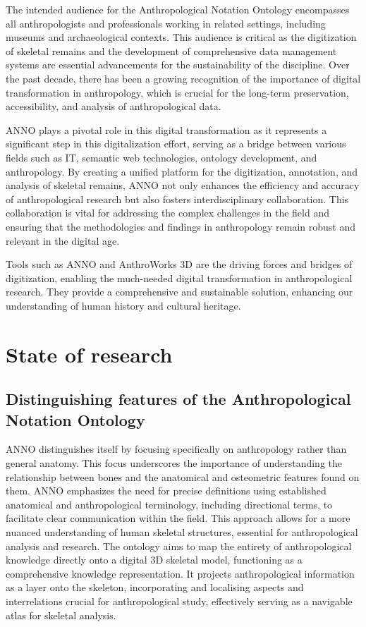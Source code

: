 \documentclass[sw]{iosart2x}
\begin{document}
The intended audience for the Anthropological Notation Ontology encompasses all anthropologists and professionals working in related settings, including museums and archaeological contexts.
This audience is critical as the digitization of skeletal remains and the development of comprehensive data management systems are essential advancements for the sustainability of the discipline.
Over the past decade, there has been a growing recognition of the importance of digital transformation in anthropology, which is crucial for the long-term preservation, accessibility, and analysis of anthropological data.

ANNO plays a pivotal role in this digital transformation as it represents a significant step in this digitalization effort, serving as a bridge between various fields such as IT, semantic web technologies, ontology development, and anthropology.
By creating a unified platform for the digitization, annotation, and analysis of skeletal remains, ANNO not only enhances the efficiency and accuracy of anthropological research but also fosters interdisciplinary collaboration.
This collaboration is vital for addressing the complex challenges in the field and ensuring that the methodologies and findings in anthropology remain robust and relevant in the digital age.

Tools such as ANNO and AnthroWorks 3D are the driving forces and bridges of digitization, enabling the much-needed digital transformation in anthropological research.
They provide a comprehensive and sustainable solution, enhancing our understanding of human history and cultural heritage.

\section{State of research}\label{sec:stateofresearch}

\subsection{Distinguishing features of the Anthropological Notation Ontology}\label{sec:distinguishingAnno}
ANNO distinguishes itself by focusing specifically on anthropology rather than general anatomy.
This focus underscores the importance of understanding the relationship between bones and the anatomical and osteometric features found on them.
ANNO emphasizes the need for precise definitions using established anatomical and anthropological terminology, including directional terms, to facilitate clear communication within the field.
This approach allows for a more nuanced understanding of human skeletal structures, essential for anthropological analysis and research.
The ontology aims to map the entirety of anthropological knowledge directly onto a digital 3D skeletal model, functioning as a comprehensive knowledge representation.
It projects anthropological information as a layer onto the skeleton, incorporating and localising aspects and interrelations crucial for anthropological study, effectively serving as a navigable atlas for skeletal analysis.
\end{document}
